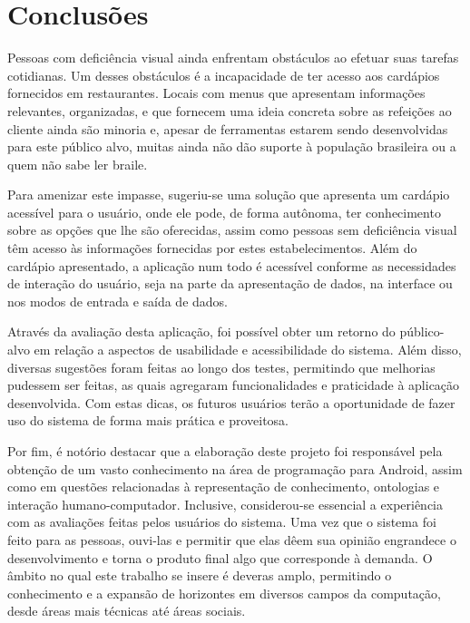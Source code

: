 \chapter{\label{chap:conclu}Conclusões}

Pessoas com deficiência visual ainda enfrentam obstáculos ao efetuar suas tarefas cotidianas. Um desses obstáculos é a incapacidade de ter acesso aos cardápios fornecidos em restaurantes. Locais com menus que apresentam informações relevantes, organizadas, e que fornecem uma ideia concreta sobre as refeições ao cliente ainda são minoria e, apesar de ferramentas estarem sendo desenvolvidas para este público alvo, muitas ainda não dão suporte à população brasileira ou a quem não sabe ler braile.

Para amenizar este impasse, sugeriu-se uma solução que apresenta um cardápio acessível para o usuário, onde ele pode, de forma autônoma, ter conhecimento sobre as opções que lhe são oferecidas, assim como pessoas sem deficiência visual têm acesso às informações fornecidas por estes estabelecimentos. Além do cardápio apresentado, a aplicação num todo é acessível conforme as necessidades de interação do usuário, seja na parte da apresentação de dados, na interface ou nos modos de entrada e saída de dados.

Através da avaliação desta aplicação, foi possível obter um retorno do público-alvo em relação a aspectos de usabilidade e acessibilidade do sistema. Além disso, diversas sugestões foram feitas ao longo dos testes, permitindo que melhorias pudessem ser feitas, as quais agregaram funcionalidades e praticidade à aplicação desenvolvida. Com estas dicas, os futuros usuários terão a oportunidade de fazer uso do sistema de forma mais prática e proveitosa.

Por fim, é notório destacar que a elaboração deste projeto foi responsável pela obtenção de um vasto conhecimento na área de programação para Android, assim como em questões relacionadas à representação de conhecimento, ontologias e interação humano-computador. Inclusive, considerou-se essencial a experiência com as avaliações feitas pelos usuários do sistema. Uma vez que o sistema foi feito para as pessoas, ouvi-las e permitir que elas dêem sua opinião engrandece o desenvolvimento e torna o produto final algo que corresponde à demanda. O âmbito no qual este trabalho se insere é deveras amplo, permitindo o conhecimento e a expansão de horizontes em diversos campos da computação, desde áreas mais técnicas até áreas sociais. 

